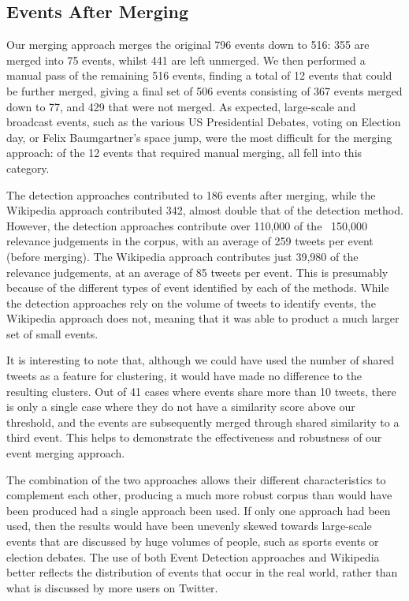 \subsection{Events After Merging}
Our merging approach merges the original 796 events down to 516: 355 are merged into 75 events, whilst 441 are left unmerged.
We then performed a manual pass of the remaining 516 events, finding a total of 12 events that could be further merged, giving a final set of 506 events consisting of 367 events merged down to 77, and 429 that were not merged.
As expected, large-scale and broadcast events, such as the various US Presidential Debates, voting on Election day, or Felix Baumgartner's space jump, were the most difficult for the merging approach: of the 12 events that required manual merging, all fell into this category.

The detection approaches contributed to 186 events after merging, while the Wikipedia approach contributed 342, almost double that of the detection method.
However, the detection approaches contribute over 110,000 of the ~150,000 relevance judgements in the corpus, with an average of 259 tweets per event (before merging).
The Wikipedia approach contributes just 39,980 of the relevance judgements, at an average of 85 tweets per event.
This is presumably because of the different types of event identified by each of the methods.
While the detection approaches rely on the volume of tweets to identify events, the Wikipedia approach does not, meaning that it was able to product a much larger set of small events.

It is interesting to note that, although we could have used the number of shared tweets as a feature for clustering, it would have made no difference to the resulting clusters.
Out of 41 cases where events share more than 10 tweets, there is only a single case where they do not have a similarity score above our threshold, and the events are subsequently merged through shared similarity to a third event.
This helps to demonstrate the effectiveness and robustness of our event merging approach.

The combination of the two approaches allows their different characteristics to complement each other, producing a much more robust corpus than would have been produced had a single approach been used.
If only one approach had been used, then the results would have been unevenly skewed towards large-scale events that are discussed by huge volumes of people, such as sports events or election debates.
The use of both Event Detection approaches and Wikipedia  better reflects the distribution of events that occur in the real world, rather than what is discussed by more users on Twitter.

